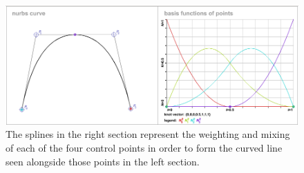 \begin{figure}  
\includegraphics[width=\textwidth]{figures/systemDesign/urbsDemo.png}
\caption[3rd order (Quadratic) URBS curve and corresponding basis splines]{The splines in the right section represent the weighting and mixing of each of the four control points in order to form the curved line seen alongside those points in the left section.\cite{website:nurbsDemo}  
\label{fig:urbsDemo}}
\end{figure}
